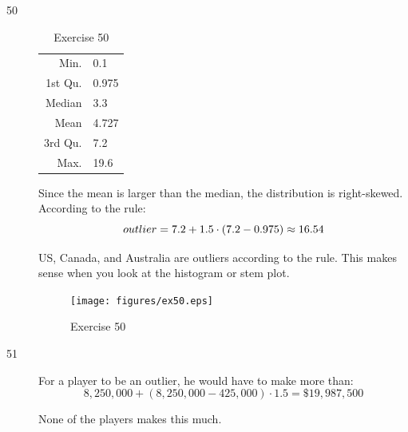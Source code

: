 \documentclass{exam}
\begin{document}
\begin{description}


      \item[50]
        \begin{table}[H]
          \centering
          \begin{tabular}{rl}
            \toprule
            Min.    & 0.1 \\
            1st Qu. & 0.975 \\
            Median  & 3.3 \\
            Mean    & 4.727 \\
            3rd Qu. & 7.2 \\
            Max.    & 19.6 \\
            \bottomrule
          \end{tabular}
          \caption{Exercise 50}
        \end{table}

        Since the mean is larger than the median, the distribution is right-skewed.
        According to the rule:
        \[
          outlier = 7.2 + 1.5 \cdot (7.2 - 0.975) \approx 16.54 \\
        \]

        US, Canada, and Australia are outliers according to the rule.  This
        makes sense when you look at the histogram or stem plot.

        \begin{figure}[H]
          \centering
          \texttt{[image: figures/ex50.eps]}
          \caption{Exercise 50}
        \end{figure}

      \item[51] 
        For a player to be an outlier, he would have to make more than:
        \[
          8,250,000 + (8,250,000 - 425,000) \cdot 1.5 = \$19,987,500
        \]

        None of the players makes this much.

    \end{description}
\end{document}
